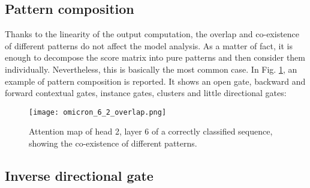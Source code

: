 \documentclass[11pt,a4paper,reqno]{amsart} %
\theoremstyle{definition}
\numberwithin{equation}{section}          %
\begin{document}
\subsection{Pattern composition}

Thanks to the linearity of the output computation, the overlap and co-existence of different patterns do not affect the model analysis. As a matter of fact, it is enough to decompose the score matrix into pure patterns and then consider them individually. Nevertheless, this is basically the most common case. In Fig. \ref{fig:omicron_6_2_overlap}, an example of pattern composition is reported. It shows an open gate, backward and forward contextual gates, instance gates, clusters and little directional gates:
\begin{figure}[h!]
    \centering
    {\texttt{[image: omicron\_6\_2\_overlap.png]}}
    \caption{Attention map of head 2, layer 6 of a correctly classified sequence, showing the co-existence of different patterns.}
    \label{fig:omicron_6_2_overlap}
\end{figure}

\subsection{Inverse directional gate}
\end{document}
